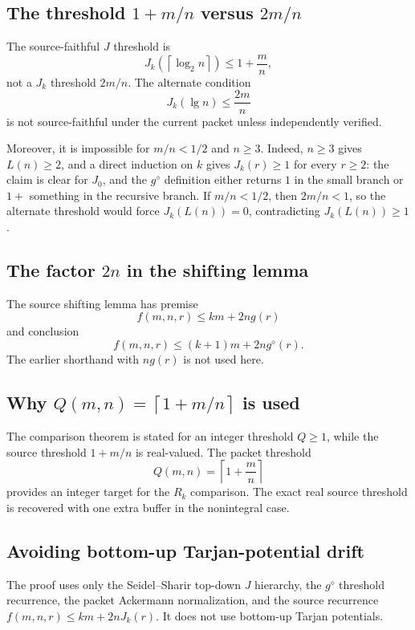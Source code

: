 ﻿\documentclass[11pt]{article}
\newcommand{\ceil}[1]{\left\lceil #1 \right\rceil}
\begin{document}
\subsection{The threshold \texorpdfstring{$1+m/n$ versus $2m/n$}{1+m/n versus 2m/n}}

The source-faithful $J$ threshold is
\[
J_k(\ceil{\log_2 n})\le1+\frac mn,
\]
not a $J_k$ threshold $2m/n$.  The alternate condition
\[
J_k(\lg n)\le\frac{2m}{n}
\]
is not source-faithful under the current packet unless independently verified.

Moreover, it is impossible for $m/n<1/2$ and $n\ge3$.  Indeed, $n\ge3$ gives $L(n)\ge2$, and a direct induction on $k$ gives $J_k(r)\ge1$ for every $r\ge2$: the claim is clear for $J_0$, and the $g^\diamond$ definition either returns $1$ in the small branch or $1+$ something in the recursive branch.  If $m/n<1/2$, then $2m/n<1$, so the alternate threshold would force $J_k(L(n))=0$, contradicting $J_k(L(n))\ge1$.

\subsection{The factor \texorpdfstring{$2n$}{2n} in the shifting lemma}

The source shifting lemma has premise
\[
f(m,n,r)\le km+2ng(r)
\]
and conclusion
\[
f(m,n,r)\le(k+1)m+2n g^\diamond(r).
\]
The earlier shorthand with $ng(r)$ is not used here.

\subsection{Why \texorpdfstring{$Q(m,n)=\ceil{1+m/n}$}{Q(m,n)=ceil(1+m/n)} is used}

The comparison theorem is stated for an integer threshold $Q\ge1$, while the source threshold $1+m/n$ is real-valued.  The packet threshold
\[
Q(m,n)=\ceil{1+\frac mn}
\]
provides an integer target for the $R_k$ comparison.  The exact real source threshold is recovered with one extra buffer in the nonintegral case.

\subsection{Avoiding bottom-up Tarjan-potential drift}

The proof uses only the Seidel--Sharir top-down $J$ hierarchy, the $g^\diamond$ threshold recurrence, the packet Ackermann normalization, and the source recurrence $f(m,n,r)\le km+2nJ_k(r)$.  It does not use bottom-up Tarjan potentials.
\end{document}
